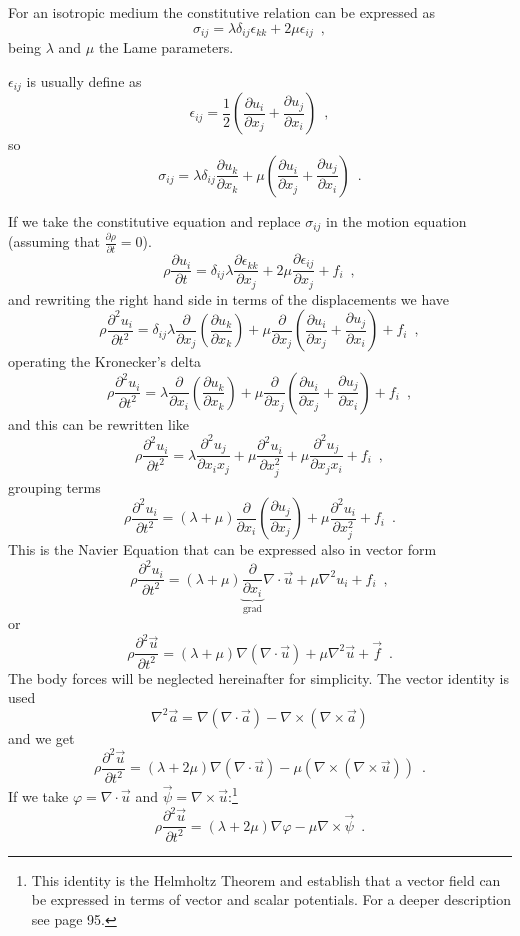 \documentclass[12pt,letterpaper]{article}
\newcommand{\pardiff}[2]{\frac{\partial #1}{\partial #2}}
\begin{document}
For an isotropic medium the constitutive relation can be expressed as
\[\sigma_{ij} = \lambda \delta_{ij}\epsilon_{kk} + 2\mu \epsilon_{ij} \enspace ,\]
being $\lambda$ and $\mu$ the Lame parameters.

$\epsilon_{ij}$ is usually define as
\[\epsilon_{ij} = \frac{1}{2} \left( \pardiff{u_i}{x_j} + \pardiff{u_j}{x_i} \right) \enspace ,\]
so
\[\sigma_{ij} = \lambda \delta_{ij} \pardiff{u_k}{x_k} + \mu \left( \pardiff{u_i}{x_j} + \pardiff{u_j}{x_i} \right) \enspace .\]

If we take the constitutive equation and replace $\sigma_{ij}$ in the motion equation (assuming that $\pardiff{\rho}{t}=0$).
\[\rho \pardiff{u_i}{t} = \delta_{ij} \lambda \pardiff{\epsilon_{kk}}{x_j} + 2\mu \pardiff{\epsilon_{ij}}{x_j} +f_i \enspace ,\]
and rewriting the right hand side in terms of the displacements we have
\[\rho \pardiff{^2 u_i}{t^2} = \delta_{ij} \lambda \pardiff{}{x_j}\left( \pardiff{u_k}{x_k}\right) + \mu \pardiff{ }{x_j}\left( \pardiff{u_i}{x_j} + \pardiff{u_j}{x_i}\right) + f_i \enspace ,\]
operating the Kronecker's delta
\[\rho \pardiff{^2 u_i}{t^2} = \lambda \pardiff{}{x_i}\left( \pardiff{u_k}{x_k}\right) + \mu \pardiff{}{x_j}\left( \pardiff{u_i}{x_j} + \pardiff{u_j}{x_i} \right) + f_i \enspace ,\]
and this can be rewritten like
\[\rho \pardiff{^2 u_i}{t^2} = \lambda  \pardiff{^2 u_j}{x_i x_j} + \mu \pardiff{^2 u_i}{x_j^2} + \mu \pardiff{^2 u_j}{x_j x_i} + f_i \enspace ,\]
grouping terms
\begin{equation}
\rho \pardiff{^2 u_i}{t^2} = (\lambda + \mu)  \pardiff{}{x_i}\left( \pardiff{u_j}{x_j} \right) + \mu \pardiff{^2 u_i}{x_j^2}  + f_i \enspace .
\label{eq:navierInd}
\end{equation}
This is the Navier Equation that can be expressed also in vector form
\[\rho \pardiff{^2 u_i}{t^2} = (\lambda + \mu)  \underbrace{\pardiff{}{x_i}}_{\mbox{grad}}\nabla \cdot \vec{u} + \mu \nabla^2 u_i + f_i \enspace ,\]
or
\begin{equation}
\rho \pardiff{^2 \vec{u}}{t^2} = (\lambda + \mu)  \nabla (\nabla\cdot \vec{u})+ \mu \nabla^2 \vec{u} + \vec{f} \enspace .
\label{eq:navierVec}
\end{equation}
The body forces will be neglected hereinafter for simplicity. The vector identity is used
\[\nabla^2 \vec{a} = \nabla (\nabla \cdot \vec{a}) - \nabla \times (\nabla \times \vec{a})\]
and we get
\[\rho \pardiff{^2 \vec{u}}{t^2} = (\lambda + 2\mu) \nabla(\nabla \cdot \vec{u}) - \mu (\nabla \times (\nabla \times \vec{u})) \enspace .\]
If we take $\varphi = \nabla \cdot \vec{u} $ and $\vec{\psi} = \nabla \times \vec{u}$:\footnote{This identity is the Helmholtz Theorem and establish that a vector field can be expressed in terms of vector and scalar potentials. For a deeper description see \cite{book:arfken} page 95.}
\begin{equation}
\rho \pardiff{^2 \vec{u}}{t^2} = (\lambda + 2\mu) \nabla \varphi - \mu \nabla \times \vec{\psi} \enspace .
\label{eq:waveHelm}
\end{equation}
\end{document}
